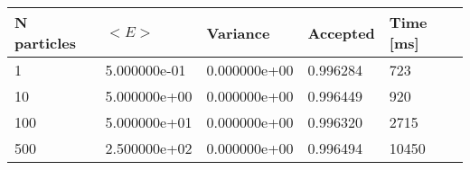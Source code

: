 \begin{table}[h!]
\begin{tabular}{|l|l|l|l|l|}
\hline 
N particles & $<E>$ & Variance & Accepted & Time [ms]\\ 
 \hline 
1 & 5.000000e-01 & 0.000000e+00 & 0.996284 & 723 \\ \hline 
10 & 5.000000e+00 & 0.000000e+00 & 0.996449 & 920 \\ \hline 
100 & 5.000000e+01 & 0.000000e+00 & 0.996320 & 2715 \\ \hline 
500 & 2.500000e+02 & 0.000000e+00 & 0.996494 & 10450 \\ \hline 
\end{tabular}
\label{i:a1} 
\end{table}
